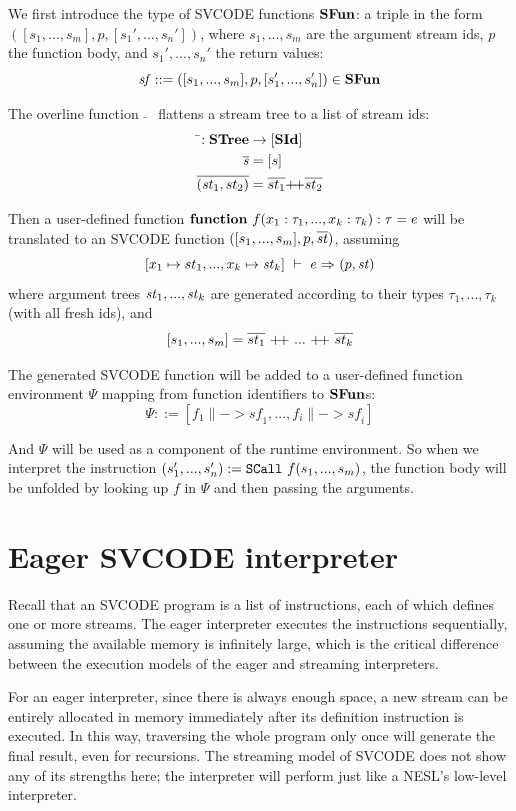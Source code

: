 \def\sf{\mathit{sf}}

We first introduce the type of SVCODE functions $\*{SFun}$: a triple in the form $([s_1,...,s_m], p, [s_1',...,s_n'])$, where $s_1,...,s_m$ are the argument stream ids, $p$ the function body, and $s_1',...,s_n'$ the return values:
$$ \sf ::= ([s_1,...,s_m], p, [s_1',...,s_n']) \in \*{SFun}$$

The overline function $\bar{}$ \ flattens a stream tree to a list of stream ids:
	\begin{align*}
\bar{}: \STree & \-> [\SId] \\
\overline{\s} & = [s] \\
\overline{(\st_1,st_2)} & = \overline{st_1} {\++} \overline{st_2}
\end{align*}

Then a user-defined function $\*{function} \  f(x_1: \tau_1, ..., x_k: \tau_k): \tau = e $ will be translated to an SVCODE function
$([s_1,...,s_m], p, \ol{\st})$, 
assuming
 $$\Trans{[x_1 \|-> st_1,..., x_k \|-> \st_k ]}{e}{}{}{\sfun{p}{\st}}$$ 
where argument trees $\st_1,...,\st_k$  are generated according to  their types $\tau_1,...,\tau_k$ (with all fresh ids), and
$$[s_1,...,s_m] = \ol{st_1} \ {\++} \ ... \ {\++} \ \ol{st_k}$$


The generated SVCODE function will be added to a user-defined function environment $\Psi$ mapping from function identifiers to $\*{SFun}$s:
$$ \Psi ::= [f_1 \|-> \sf_1,...,f_i \|-> \sf_i] $$

And $\Psi$ will be used as a component of the runtime environment. So when we interpret the instruction $\scall{f}{s_1,...,s_m}{(s_1',...,s_n')}$, the function body will be unfolded by looking up $f$ in $\Psi$ and then passing the arguments.

\section{Eager SVCODE interpreter}
Recall that an SVCODE program is a list of instructions, each of which defines one or more streams. 
The eager interpreter executes the instructions sequentially, assuming the available memory is infinitely large, which is the critical difference between the execution models of the eager and streaming interpreters.

For an eager interpreter, since there is always enough space, a  new stream can be entirely allocated in memory immediately after its definition instruction is executed.
In this way, traversing the whole program only once will generate the final result, even for recursions.
The streaming model of SVCODE does not show any of its strengths here; the interpreter will perform just like a NESL's low-level interpreter. 


